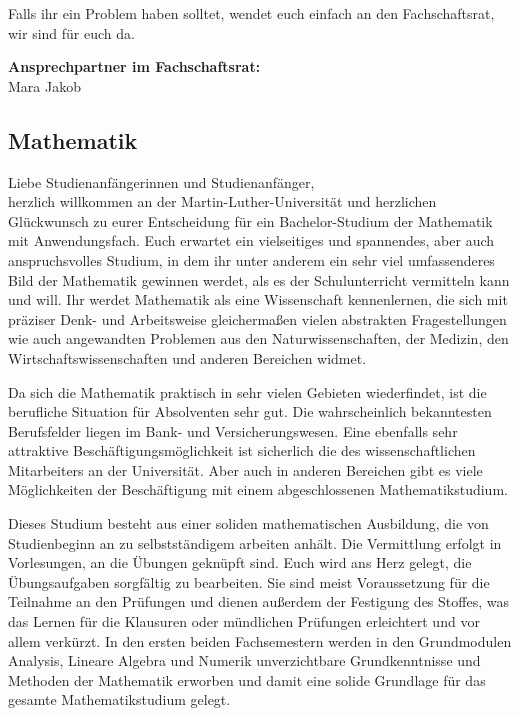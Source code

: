 Falls ihr ein Problem haben solltet, wendet euch einfach an den Fachschaftsrat, wir sind für euch da.

\textbf{Ansprechpartner im Fachschaftsrat:}\\
Mara Jakob\\


\subsection{Mathematik}
\label{studiengang_mathematik}

Liebe Studienanfängerinnen und Studienanfänger,\\
herzlich willkommen an der Martin-Luther-Universität und herzlichen Glückwunsch zu eurer Entscheidung für ein Bachelor-Studium der Mathematik mit Anwendungsfach.
Euch erwartet ein vielseitiges und spannendes, aber auch anspruchsvolles Studium, in dem ihr unter anderem ein sehr viel umfassenderes Bild der Mathematik gewinnen werdet, als es der Schulunterricht vermitteln kann und will.
Ihr werdet Mathematik als eine Wissenschaft kennenlernen, die sich mit präziser Denk- und Arbeitsweise gleichermaßen vielen abstrakten Fragestellungen wie auch angewandten Problemen aus den Naturwissenschaften, der Medizin, den Wirtschaftswissenschaften und anderen Bereichen widmet.

Da sich die Mathematik praktisch in sehr vielen Gebieten wiederfindet, ist die berufliche Situation für Absolventen sehr gut.
Die wahrscheinlich bekanntesten Berufsfelder liegen im Bank- und Versicherungswesen.
Eine ebenfalls sehr attraktive Beschäftigungsmöglichkeit ist sicherlich die des wissenschaftlichen Mitarbeiters an der Universität.
Aber auch in anderen Bereichen gibt es viele Möglichkeiten der Beschäftigung mit einem abgeschlossenen Mathematikstudium.

Dieses Studium besteht aus einer soliden mathematischen Ausbildung, die von Studienbeginn an zu selbstständigem arbeiten anhält.
Die Vermittlung erfolgt in Vorlesungen, an die Übungen geknüpft sind.
Euch wird ans Herz gelegt, die Übungsaufgaben sorgfältig zu bearbeiten. Sie sind meist Voraussetzung für die Teilnahme an den Prüfungen und dienen außerdem der Festigung des Stoffes, was das Lernen für die Klausuren oder mündlichen Prüfungen erleichtert und vor allem verkürzt. 
In den ersten beiden Fachsemestern werden in den Grundmodulen Analysis, Lineare Algebra und Numerik unverzichtbare Grundkenntnisse und Methoden der Mathematik erworben und damit eine solide Grundlage für das gesamte Mathematikstudium gelegt.

